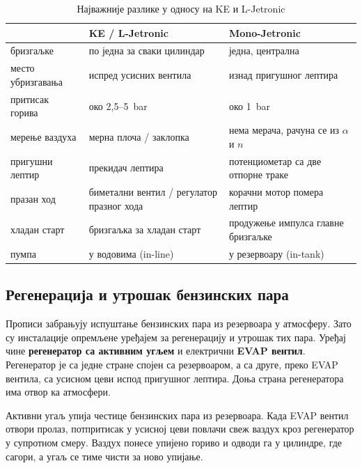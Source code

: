 \documentclass[12pt]{article}
\begin{document}
\begin{table}[H]
    \centering
    \small
    \renewcommand{\arraystretch}{1.3}
    \begin{tabular}{p{4.2cm} p{4.6cm} p{4.6cm}}
        \toprule
                                & \textbf{KE / L-Jetronic}               & \textbf{Mono-Jetronic} \\
        \midrule
        бризгаљке               & по једна за сваки цилиндар              & једна, централна \\
        место убризгавања       & испред усисних вентила                  & изнад пригушног лептира \\
        притисак горива         & око 2,5--5~bar                          & око 1~bar \\
        мерење ваздуха          & мерна плоча / заклопка                  & нема мерача, рачуна се из $\alpha$ и $n$ \\
        пригушни лептир         & прекидач лептира                        & потенциометар са две отпорне траке \\
        празан ход              & биметални вентил / регулатор празног хода & корачни мотор помера лептир \\
        хладан старт            & бризгаљка за хладан старт               & продужење импулса главне бризгаљке \\
        пумпа                   & у водовима (in-line)                    & у резервоару (in-tank) \\
        \bottomrule
    \end{tabular}
    \caption{Најважније разлике у односу на KE и L-Jetronic}
\end{table}


\subsection{Регенерација и утрошак бензинских пара}

Прописи забрањују испуштање бензинских пара из резервоара у атмосферу. Зато
су инсталације опремљене уређајем за регенерацију и утрошак тих пара. Уређај чине \textbf{регенератор са активним угљем} и електрични
\textbf{EVAP вентил}. Регенератор је са једне стране спојен са резервоаром, а
са друге, преко EVAP вентила, са усисном цеви испод пригушног лептира. Доња
страна регенератора има отвор ка атмосфери.

Активни угаљ упија честице бензинских пара из резервоара. Када EVAP вентил
отвори пролаз, потпритисак у усисној цеви повлачи свеж ваздух кроз
регенератор у супротном смеру. Ваздух понесе упијено гориво и одводи га у
цилиндре, где сагори, а угаљ се тиме чисти за ново упијање.
\end{document}
